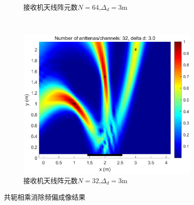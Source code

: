 \begin{figure}[H]
\begin{subfigure}[t]{.45\linewidth}
    \caption{接收机天线阵元数$N=64$,$\Delta_d = 3\text{m}$}
  \end{subfigure}
  \\
  \begin{subfigure}[t]{.45\linewidth}
    \centering
    \includegraphics[width=1\textwidth]{figures/cm/N32d3.eps}
    \caption{接收机天线阵元数$N=32$,$\Delta_d = 3\text{m}$}
  \end{subfigure}
  \caption{共轭相乘消除频偏成像结果}\label{共轭相乘消除频偏成像结果}
\end{figure}


